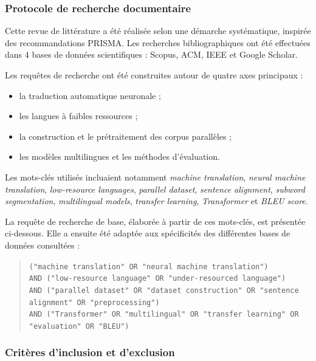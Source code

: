 \subsubsection{Protocole de recherche documentaire}

Cette revue de littérature a été réalisée selon une démarche systématique, inspirée des recommandations \ac{PRISMA}. Les recherches bibliographiques ont été effectuées dans 4 bases de données scientifiques : Scopus, \ac{ACM}, \ac{IEEE} et Google Scholar.

Les requêtes de recherche ont été construites autour de quatre axes principaux :

\begin{itemize}
    \item la traduction automatique neuronale ;
    \item les langues à faibles ressources ;
    \item la construction et le prétraitement des corpus parallèles ;
    \item les modèles multilingues et les méthodes d'évaluation.
\end{itemize}

Les mots-clés utilisés incluaient notamment \textit{machine translation}, \textit{neural machine translation}, \textit{low-resource languages}, \textit{parallel dataset}, \textit{sentence alignment}, \textit{subword segmentation}, \textit{multilingual models}, \textit{transfer learning}, \textit{Transformer} et \textit{BLEU score}.

La requête de recherche de base, élaborée à partir de ces mots-clés, est présentée ci-dessous. Elle a ensuite été adaptée aux spécificités des différentes bases de données consultées :

\begin{quote}
\texttt{("machine translation" OR "neural machine translation")}\\
\texttt{AND ("low-resource language" OR "under-resourced language")}\\
\texttt{AND ("parallel dataset" OR "dataset construction" OR "sentence alignment" OR "preprocessing")}\\
\texttt{AND ("Transformer" OR "multilingual" OR "transfer learning" OR "evaluation" OR "BLEU")}
\end{quote}


\subsubsection{Critères d'inclusion et d'exclusion}

